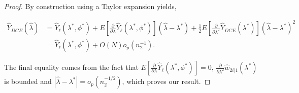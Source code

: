 \documentclass[12pt]{article}
\begin{document}
\begin{proof}
  By construction using a Taylor expansion yields,

  \begin{align*}
    \hat Y_{DCE}(\hat \lambda) 
    &= \hat Y_\ell(\lambda^*, \phi^*) + 
    E\left[\frac{\partial}{\partial \lambda}\hat Y_\ell(\lambda^*,
    \phi^*)\right](\hat \lambda - \lambda^*) + \frac{1}{2}
    E\left[\frac{\partial}{\partial \lambda^2} \hat Y_{DCE}(\lambda^*)\right] (\hat
    \lambda - \lambda^*)^2\\
    &= \hat Y_\ell(\lambda^*, \phi^*) + O(N)o_p(n_2^{-1}).
  \end{align*}

  The final equality comes from the fact that 
  $E\left[\frac{\partial}{\partial \lambda}\hat Y_\ell(\lambda^*, \phi^*)\right]
  = 0$, $\frac{\partial}{\partial \lambda^2} \hat w_{2i|1}(\lambda^*)$ is
  bounded and $|\hat \lambda - \lambda^*| = o_p(n_2^{-1/2})$, which proves our
  result.

\end{proof}
\end{document}
